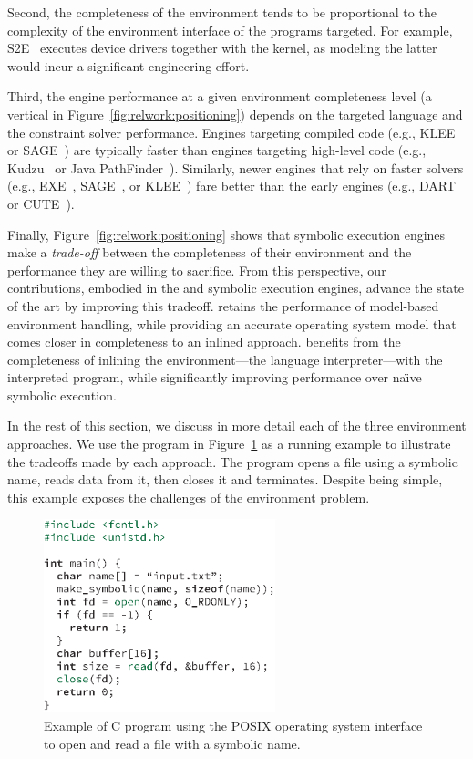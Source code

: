 Second, the completeness of the environment tends to be proportional to the complexity of the environment interface of the programs targeted.
%
For example, S2E~\cite{s2eSystem} executes device drivers together with the kernel, as modeling the latter would incur a significant engineering effort.

Third, the engine performance at a given environment completeness level (a vertical in Figure~\ref{fig:relwork:positioning}) depends on the targeted language and the constraint solver performance.
%
Engines targeting compiled code (e.g., KLEE~\cite{klee} or SAGE~\cite{godefroid:fuzz}) are typically faster than engines targeting high-level code (e.g., Kudzu~\cite{saxena-kudzu} or Java PathFinder~\cite{jpf-symbex}).
%
Similarly, newer engines that rely on faster solvers (e.g., EXE~\cite{exe}, SAGE~\cite{godefroid:fuzz}, or KLEE~\cite{klee}) fare better than the early engines (e.g., DART~\cite{dart} or CUTE~\cite{cute}).

Finally, Figure~\ref{fig:relwork:positioning} shows that symbolic execution engines make a \emph{trade-off} between the completeness of their environment and the performance they are willing to sacrifice.
%
From this perspective, our contributions, embodied in the \chef and \cnine symbolic execution engines, advance the state of the art by improving this tradeoff.
%
\cnine retains the performance of model-based environment handling, while providing an accurate operating system model that comes closer in completeness to an inlined approach.
%
\chef benefits from the completeness of inlining the environment---the language interpreter---with the interpreted program, while significantly improving performance over na\"{\i}ve symbolic execution.

In the rest of this section, we discuss in more detail each of the three environment approaches.
%
We use the program in Figure~\ref{fig:relwork:example} as a running example to illustrate the tradeoffs made by each approach.
%
The program opens a file using a symbolic name, reads data from it, then closes it and terminates.  Despite being simple, this example exposes the challenges of the environment problem.

\begin{figure}
  \centering
  \includegraphics[width=0.6\textwidth]{relatedwork/figures/environment-example}
  \caption{Example of C program using the POSIX operating system interface to open and read a file with a symbolic name.}
  \label{fig:relwork:example}
\end{figure}

